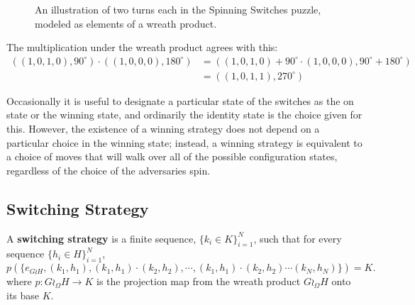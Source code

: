 \begin{example}
\begin{figure}
    \caption{An illustration of two turns each in the Spinning Switches puzzle,
    modeled as elements of a wreath product.}
    \label{fig:WreathProduct}
  \end{figure}

  The multiplication under the wreath product agrees with this: \begin{align*}
    ((1,0,1,0), 90^\circ) \cdot ((1,0,0,0), 180^\circ)
    &= ((1,0,1,0) + 90^\circ \cdot (1,0,0,0), 90^\circ + 180^\circ) \\
    &= ((1,0,1,1), 270^\circ)
  \end{align*}
\end{example}

Occasionally it is useful to designate a particular state of the switches as the
on state or the winning state, and ordinarily the identity state is the choice
given for this. However, the existence of a winning strategy does not depend on
a particular choice in the winning state; instead, a winning strategy is
equivalent to a choice of moves that will walk over all of the possible
configuration states, regardless of the choice of the adversaries spin.

\subsection{Switching Strategy}

\begin{definition}
  A \textbf{switching strategy} is a finite sequence, $\{k_i \in K\}_{i=1}^N$,
  such that for every sequence ${\{h_i \in H\}_{i=1}^N}$,
  \[
    p(\{e_{G \wr H}, (k_1, h_1), (k_1, h_1)\cdot(k_2, h_2), \cdots, (k_1, h_1)\cdot(k_2, h_2)\cdots(k_N, h_N)\}) = K.
  \]
  where $p \colon G \wr_\Omega H \rightarrow K$ is the projection map from the
  wreath product $G \wr_\Omega H$ onto its base $K$.
\end{definition}

